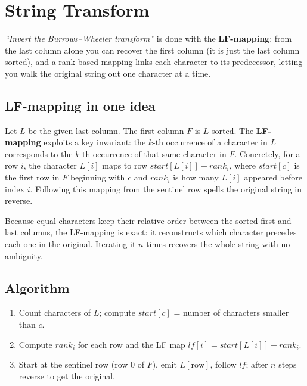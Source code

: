 \section{String Transform}
\label{sec:cses-string-transform}


\begin{patternbox}
\emph{``Invert the Burrows--Wheeler transform''} is done with the
\textbf{LF-mapping}: from the last column alone you can recover the first
column (it is just the last column sorted), and a rank-based mapping links
each character to its predecessor, letting you walk the original string out
one character at a time.
\end{patternbox}

\subsection*{LF-mapping in one idea}

Let $L$ be the given last column. The first column $F$ is $L$ sorted. The
\textbf{LF-mapping} exploits a key invariant: the $k$-th occurrence of a
character in $L$ corresponds to the $k$-th occurrence of that same
character in $F$. Concretely, for a row $i$, the character $L[i]$ maps to
row $\textit{start}[L[i]]+\textit{rank}_i$, where $\textit{start}[c]$ is
the first row in $F$ beginning with $c$ and $\textit{rank}_i$ is how many
$L[i]$ appeared before index $i$. Following this mapping from the sentinel
row spells the original string in reverse.

\begin{ideabox}
Because equal characters keep their relative order between the sorted-first
and last columns, the LF-mapping is exact: it reconstructs which character
precedes each one in the original. Iterating it $n$ times recovers the
whole string with no ambiguity.
\end{ideabox}

\subsection*{Algorithm}

\begin{enumerate}
  \item Count characters of $L$; compute $\textit{start}[c]$ = number of
        characters smaller than $c$.
  \item Compute $\textit{rank}_i$ for each row and the LF map
        $\textit{lf}[i]=\textit{start}[L[i]]+\textit{rank}_i$.
  \item Start at the sentinel row (row $0$ of $F$), emit $L[\text{row}]$,
        follow $\textit{lf}$; after $n$ steps reverse to get the original.
\end{enumerate}

